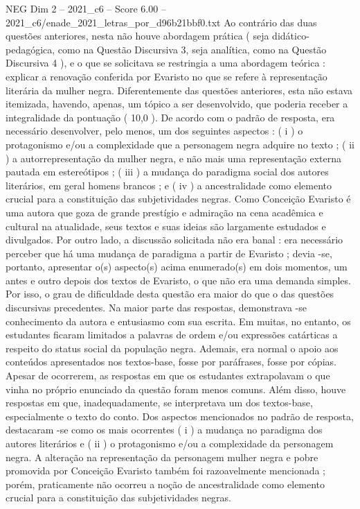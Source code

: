 \begin{textsample}{NEG Dim 2 – 2021\_c6 – Score 6.00 – 2021\_c6/enade\_2021\_letras\_por\_d96b21bbf0.txt}
Ao contrário das duas questões anteriores, nesta não houve abordagem prática ( seja didático-pedagógica, como na Questão Discursiva 3, seja analítica, como na Questão Discursiva 4 ), e o que se solicitava se restringia a uma abordagem teórica : explicar a renovação conferida por Evaristo no que se refere à representação literária da mulher negra.
Diferentemente das questões anteriores, esta não estava itemizada, havendo, apenas, um tópico a ser desenvolvido, que poderia receber a integralidade da pontuação ( 10,0 ).
De acordo com o padrão de resposta, era necessário desenvolver, pelo menos, um dos seguintes aspectos : ( i ) o protagonismo e/ou a complexidade que a personagem negra adquire no texto ; ( ii ) a autorrepresentação da mulher negra, e não mais uma representação externa pautada em estereótipos ; ( iii ) a mudança do paradigma social dos autores literários, em geral homens brancos ; e ( iv ) a ancestralidade como elemento crucial para a constituição das subjetividades negras.
Como Conceição Evaristo é uma autora que goza de grande prestígio e admiração na cena acadêmica e cultural na atualidade, seus textos e suas ideias são largamente estudados e divulgados.
Por outro lado, a discussão solicitada não era banal : era necessário perceber que há uma mudança de paradigma a partir de Evaristo ; devia -se, portanto, apresentar o(s) aspecto(s) acima enumerado(s) em dois momentos, um antes e outro depois dos textos de Evaristo, o que não era uma demanda simples.
Por isso, o grau de dificuldade desta questão era maior do que o das questões discursivas precedentes.
Na maior parte das respostas, demonstrava -se conhecimento da autora e entusiasmo com sua escrita.
Em muitas, no entanto, os estudantes ficaram limitados a palavras de ordem e/ou expressões catárticas a respeito do status social da população negra.
Ademais, era normal o apoio aos conteúdos apresentados nos textos-base, fosse por paráfrases, fosse por cópias.
Apesar de ocorrerem, as respostas em que os estudantes extrapolavam o que vinha no próprio enunciado da questão foram menos comuns.
Além disso, houve respostas em que, inadequadamente, se interpretava um dos textos-base, especialmente o texto do conto.
Dos aspectos mencionados no padrão de resposta, destacaram -se como os mais ocorrentes ( i ) a mudança no paradigma dos autores literários e ( ii ) o protagonismo e/ou a complexidade da personagem negra.
A alteração na representação da personagem mulher negra e pobre promovida por Conceição Evaristo também foi razoavelmente mencionada ; porém, praticamente não ocorreu a noção de ancestralidade como elemento crucial para a constituição das subjetividades negras.

\end{textsample}
